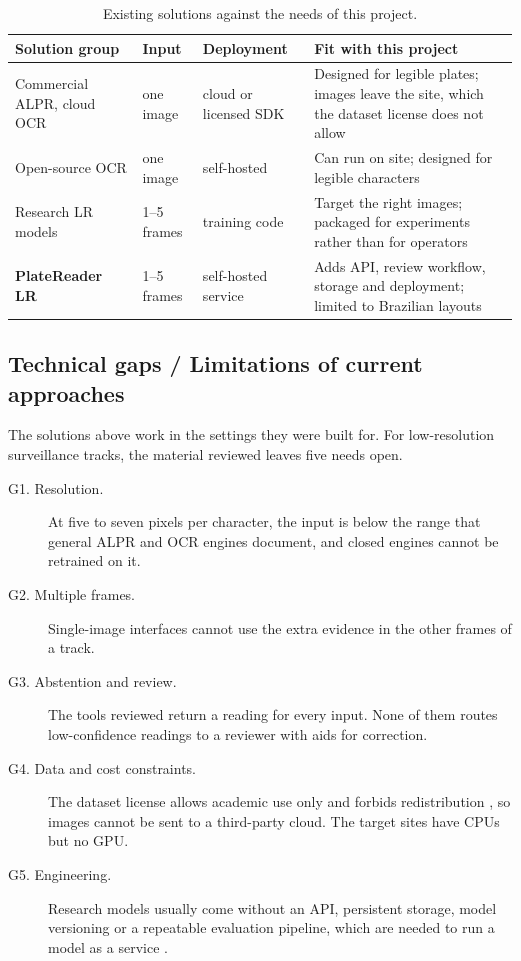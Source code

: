 \begin{table}[tbp]
\centering
\caption{Existing solutions against the needs of this project.}
\label{tab:existing}
\begin{tabularx}{\textwidth}{@{}P{25mm} P{17mm} P{19mm} L@{}}
\toprule
Solution group & Input & Deployment & Fit with this project \\
\midrule
Commercial ALPR, cloud OCR & one image & cloud or licensed SDK & Designed for legible plates; images leave the site, which the dataset license does not allow \\
Open-source OCR & one image & self-hosted & Can run on site; designed for legible characters \\
Research LR models & 1--5 frames & training code & Target the right images; packaged for experiments rather than for operators \\
\textbf{PlateReader LR} & 1--5 frames & self-hosted service & Adds API, review workflow, storage and deployment; limited to Brazilian layouts \\
\bottomrule
\end{tabularx}
\end{table}

\subsection{Technical gaps / Limitations of current approaches}

The solutions above work in the settings they were built for. For low-resolution surveillance
tracks, the material reviewed leaves five needs open.

\begin{description}
  \item[G1. Resolution.] At five to seven pixels per character, the input is below the range that
        general ALPR and OCR engines document, and closed engines cannot be retrained on it.
  \item[G2. Multiple frames.] Single-image interfaces cannot use the extra evidence in the other
        frames of a track.
  \item[G3. Abstention and review.] The tools reviewed return a reading for every input. None of
        them routes low-confidence readings to a reviewer with aids for correction.
  \item[G4. Data and cost constraints.] The dataset license allows academic use only and forbids
        redistribution \cite{icpr26license}, so images cannot be sent to a third-party cloud. The
        target sites have CPUs but no GPU.
  \item[G5. Engineering.] Research models usually come without an API, persistent storage, model
        versioning or a repeatable evaluation pipeline, which are needed to run a model as a
        service \cite{sculley2015hidden}.
\end{description}

